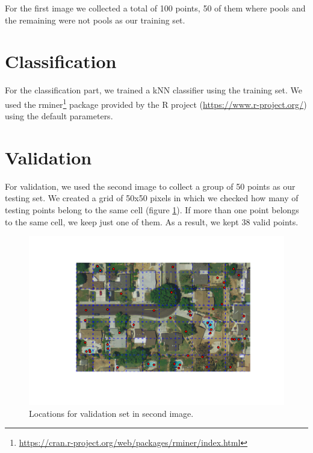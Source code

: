 \documentclass{article}
\begin{document}
For the first image we collected a total of 100 points, 50 of them where pools and the remaining were not pools as our training set.

\section{Classification}
For the classification part, we trained a kNN classifier using the training set.  We used the rminer\footnote{\url{https://cran.r-project.org/web/packages/rminer/index.html}} package provided by the R project (\url{https://www.r-project.org/}) using the default parameters. 

\section{Validation}
For validation, we used the second image to collect a group of 50 points as our testing set. We created a grid of 50x50 pixels in which we checked how many of testing points belong to the same cell (figure \ref{fig:locations}). If more than one point belongs to the same cell, we keep just one of them. As a result, we kept 38 valid points. 

\begin{figure}
 \centering
 \includegraphics[trim=80 60 70 50 , clip, width=1\textwidth]{../figures/grid3.pdf}
 \caption{Locations for validation set in second image.}
 \label{fig:locations}
\end{figure}
\end{document}
